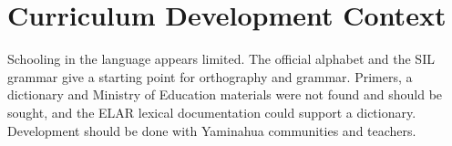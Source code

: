 \documentclass[12pt]{article}
\begin{document}
\section{Curriculum Development Context}
Schooling in the language appears limited. The official alphabet and the SIL grammar give a starting point for orthography and grammar. Primers, a dictionary and Ministry of Education materials were not found and should be sought, and the ELAR lexical documentation could support a dictionary. Development should be done with Yaminahua communities and teachers.
\end{document}
